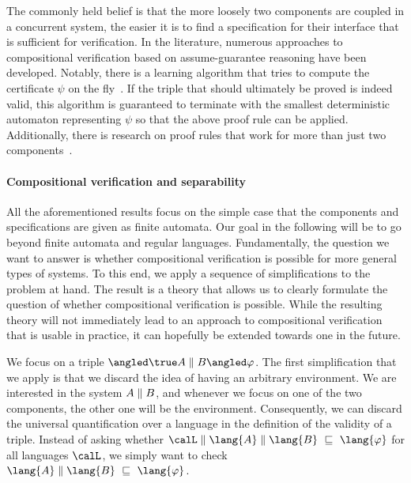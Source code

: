 \documentclass[../../diss.tex]{subfiles}
\begin{document}
The commonly held belief is that the more loosely two components are coupled in a concurrent system, the easier it is to find a specification for their interface that is sufficient for verification.
In the literature, numerous approaches to compositional verification based on assume-guarantee reasoning have been developed.
Notably, there is a learning algorithm that tries to compute the certificate $\psi$ on the fly~\cite{CobleighGP03,PasareanuGBCB08}.
If the triple that should ultimately be proved is indeed valid, this algorithm is guaranteed to terminate with the smallest deterministic automaton representing $\psi$ so that the above proof rule can be applied.
Additionally, there is research on proof rules that work \eg for more than just two components~\cite{PasareanuGBCB08}.

\paragraph{Compositional verification and separability}

All the aforementioned results focus on the simple case that the components and specifications are given as finite automata.
Our goal in the following will be to go beyond finite automata and regular languages.
Fundamentally, the question we want to answer is whether compositional verification is possible for more general types of systems.
To this end, we apply a sequence of simplifications to the problem at hand.
The result is a theory that allows us to clearly formulate the question of whether compositional verification is possible.
While the resulting theory will not immediately lead to an approach to compositional verification that is usable in practice, it can hopefully be extended towards one in the future.

We focus on a triple $\agtriple{\true}{A \parcomp B}{\varphi}$.
The first simplification that we apply is that we discard the idea of having an arbitrary environment.
We are interested in the system $A \mathrel{\|} B$, and whenever we focus on one of the two components, the other one will be the environment.
Consequently, we can discard the universal quantification over a language in the definition of the validity of a triple.
Instead of asking whether $\calL \parcomp \lang{A} \parcomp \lang{B} \ \sqsubseteq \ \lang{\varphi}$ for all languages $\calL$, we simply want to check $\lang{A} \parcomp \lang{B} \ \sqsubseteq \ \lang{\varphi}$.
\end{document}
